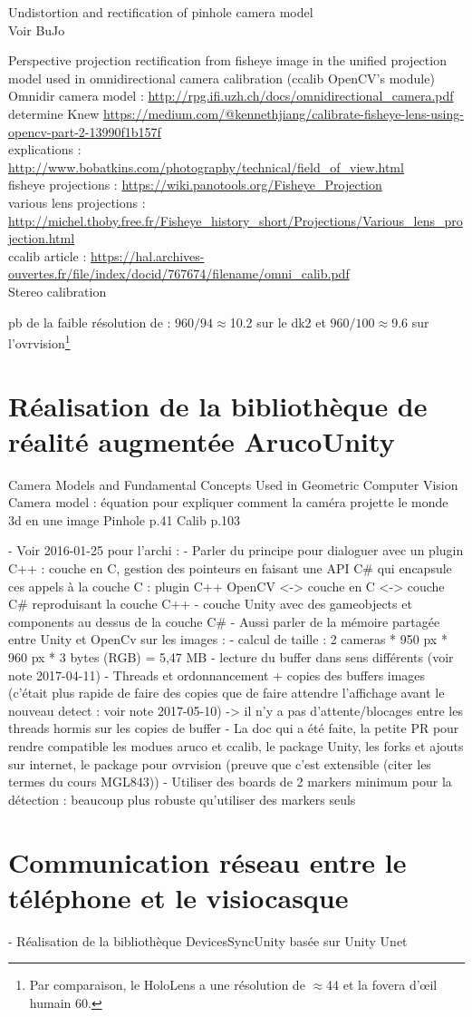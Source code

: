 Undistortion and rectification of pinhole camera model\\
Voir BuJo

Perspective projection rectification from fisheye image in the unified projection model used in omnidirectional camera calibration (ccalib OpenCV's module)\\
Omnidir camera model : \url{http://rpg.ifi.uzh.ch/docs/omnidirectional_camera.pdf}\\
determine Knew \url{https://medium.com/@kennethjiang/calibrate-fisheye-lens-using-opencv-part-2-13990f1b157f}\\
explications : \url{http://www.bobatkins.com/photography/technical/field_of_view.html}\\
fisheye projections : \url{https://wiki.panotools.org/Fisheye_Projection}\\
various lens projections : \url{http://michel.thoby.free.fr/Fisheye_history_short/Projections/Various_lens_projection.html}\\
ccalib article : \url{https://hal.archives-ouvertes.fr/file/index/docid/767674/filename/omni_calib.pdf}\\

Stereo calibration


pb de la faible résolution de : $960 / 94 \approx$\SI{10.2}{\ppd} sur le dk2 et $960 / 100 \approx$\SI{9.6}{\ppd} sur l'ovrvision\footnote{Par comparaison, le HoloLens a une résolution de $\approx$\SI{44}{\ppd} et la fovera d'\oe il humain \SI{60}{\ppd}.}

\section{Réalisation de la bibliothèque de réalité augmentée ArucoUnity}
Camera Models and Fundamental Concepts Used in Geometric Computer Vision
Camera model : équation pour expliquer comment la caméra projette le monde 3d en une image
Pinhole p.41
Calib p.103

- Voir 2016-01-25 pour l'archi :
  - Parler du principe pour dialoguer avec un plugin C++ : couche en C, gestion des pointeurs en faisant une API C\# qui encapsule ces appels à la couche C : plugin C++ OpenCV <-> couche en C <-> couche C\# reproduisant la couche C++ 
  - couche Unity avec des gameobjects et components au dessus de la couche C\#
- Aussi parler de la mémoire partagée entre Unity et OpenCv sur les images :
  - calcul de taille : 2 cameras * 950 px * 960 px * 3 bytes (RGB) = 5,47 MB
  - lecture du buffer dans sens différents (voir note 2017-04-11)
  - Threads et ordonnancement + copies des buffers images (c'était plus rapide de faire des copies que de faire attendre l'affichage avant le nouveau detect : voir note 2017-05-10) -> il n'y a pas d'attente/blocages entre les threads hormis sur les copies de buffer
- La doc qui a été faite, la petite PR pour rendre compatible les modues aruco et ccalib, le package Unity, les forks et ajouts sur internet, le package pour ovrvision (preuve que c'est extensible (citer les termes du cours MGL843))
- Utiliser des boards de 2 markers minimum pour la détection : beaucoup plus robuste qu'utiliser des markers seuls


\section{Communication réseau entre le téléphone et le visiocasque}
- Réalisation de la bibliothèque DevicesSyncUnity basée sur Unity Unet